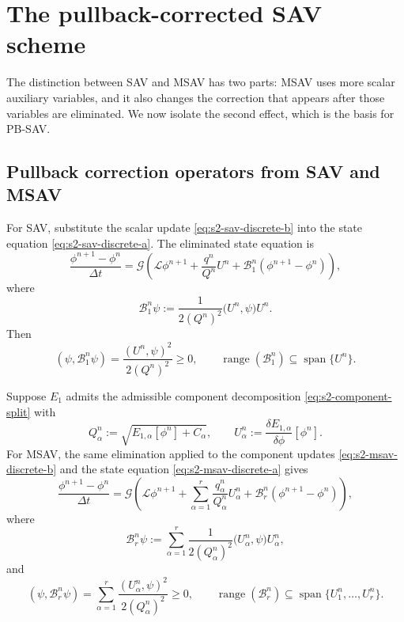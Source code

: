 \documentclass[10pt,onefignum,onetabnum,hidelinks]{siamart251216}
\begin{document}
\section{The pullback-corrected SAV scheme}
\label{sec:rank-r-sav}
The distinction between SAV and MSAV has two parts: MSAV uses more scalar auxiliary variables, and it also changes the correction that appears after those variables are eliminated.  We now isolate the second effect, which is the basis for PB-SAV.

\subsection{Pullback correction operators from SAV and MSAV}
\label{subsec:variational-form}

For SAV, substitute the scalar update \eqref{eq:s2-sav-discrete-b} into the state equation \eqref{eq:s2-sav-discrete-a}.  The eliminated state equation is
\begin{equation}
\frac{\phi^{n+1}-\phi^n}{\Delta t}
=
\mathcal G\left(
\mathcal L\phi^{n+1}
+
\frac{q^n}{Q^n}U^n
+
\mathcal B^n_1(\phi^{n+1}-\phi^n)
\right),
\label{eq:s3-scalar-eliminated}
\end{equation}
where
\begin{equation}
\mathcal B^n_1\psi
:=
\frac{1}{2(Q^n)^2}
\bigl(U^n,\psi\bigr)U^n.
\label{eq:s3-B-sav}
\end{equation}
Then
\[
(\psi,\mathcal B^n_1\psi)
=
\frac{(U^n,\psi)^2}{2(Q^n)^2}\ge0,
\qquad
\operatorname{range}(\mathcal B^n_1)\subseteq\operatorname{span}\{U^n\}.
\]

Suppose $E_1$ admits the admissible component decomposition \eqref{eq:s2-component-split}  with
\[
Q_\alpha^n:=\sqrt{E_{1,\alpha}[\phi^n]+C_\alpha},
\qquad
U_\alpha^n:=\frac{\delta E_{1,\alpha}}{\delta\phi}[\phi^n].
\]
For MSAV, the same elimination applied to the component updates \eqref{eq:s2-msav-discrete-b} and the state equation \eqref{eq:s2-msav-discrete-a} gives
\begin{equation}
\frac{\phi^{n+1}-\phi^n}{\Delta t}
=
\mathcal G\left(
\mathcal L\phi^{n+1}
+
\sum_{\alpha=1}^r
\frac{q_\alpha^n}{Q_\alpha^n}U_\alpha^n
+
\mathcal B^n_r(\phi^{n+1}-\phi^n)
\right),
\label{eq:s3-msav-eliminated}
\end{equation}
where
\begin{equation}
\mathcal B^n_r\psi
:=
\sum_{\alpha=1}^r
\frac{1}{2(Q_\alpha^n)^2}
\bigl(U_\alpha^n,\psi\bigr)U_\alpha^n,
\label{eq:s3-B-r}
\end{equation}
and 
\[
(\psi,\mathcal B^n_r\psi)
=
\sum_{\alpha=1}^r \frac{(U_\alpha^n,\psi)^2}{2(Q_\alpha^n)^2}\ge0,
\qquad
\operatorname{range}(\mathcal B^n_r)
\subseteq
\operatorname{span}\{U_1^n,\dots,U_r^n\}.
\]
\end{document}
